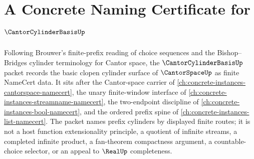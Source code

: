 \chapter{A Concrete Naming Certificate for $\CantorCylinderBasisUp$}
\label{ch:concrete-instances-cantor-cylinder-basis-namecert}

Following Brouwer's finite-prefix reading of choice sequences and the
Bishop--Bridges cylinder terminology for Cantor space, the
$\CantorCylinderBasisUp$ packet records the basic clopen cylinder surface of
$\CantorSpaceUp$ as finite NameCert data. It sits after the Cantor-space
carrier of \autoref{ch:concrete-instances-cantorspace-namecert}, the unary
finite-window interface of \autoref{ch:concrete-instances-streamname-namecert},
the two-endpoint discipline of \autoref{ch:concrete-instances-bool-namecert},
and the ordered prefix spine of \autoref{ch:concrete-instances-list-namecert}.
The packet names prefix cylinders by displayed finite routes; it is not a
host function extensionality principle, a quotient of infinite streams, a
completed infinite product, a fan-theorem compactness argument, a
countable-choice selector, or an appeal to $\RealUp$ completeness.

